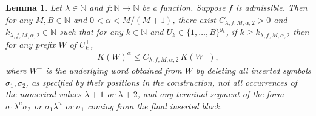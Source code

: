 \documentclass[12pt,reqno]{amsart}
\theoremstyle{definition}
\theoremstyle{plain}
\newtheorem{lemma}{Lemma}
\begin{document}
\begin{lemma}
\label{lem:stage-prefix-comparison}
Let $\lambda\in\mathbb{N}$ and $f:\mathbb{N}\to\mathbb{N}$ be a function. Suppose $f$ is admissible. Then for any $M,B\in\mathbb{N}$ and $0<\alpha<M/(M+1)$, there exist $C_{\lambda,f,M,\alpha,2}>0$ and $k_{\lambda,f,M,\alpha,2}\in\mathbb N$ such that for any $k\in\mathbb{N}$ and $U_k\in\{1,\ldots,B\}^{g_k}$, if $k\geq k_{\lambda,f,M,\alpha,2}$ then for any prefix $W$ of $U^+_k$,
\begin{align*}
    K(W)^\alpha\leq C_{\lambda,f,M,\alpha,2}\,K(W^-),
\end{align*}
where $W^-$ is the underlying word obtained from $W$ by deleting all inserted symbols $\sigma_1,\sigma_2$, as specified by their positions in the construction, not all occurrences of the numerical values $\lambda+1$ or $\lambda+2$, and any terminal segment of the form $\sigma_1\lambda^u \sigma_2$ or $\sigma_1\lambda^u$ or $\sigma_1$ coming from the final inserted block.
\end{lemma}
\end{document}
